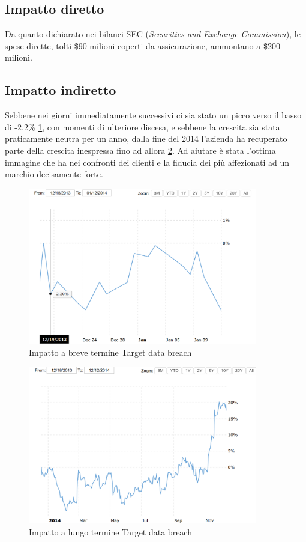 \documentclass[12pt,a4paper,openright,twoside]{report}
\begin{document}
\subsection{Impatto diretto}
Da quanto dichiarato nei bilanci SEC (\textit{Securities and Exchange Commission}), le spese dirette, tolti \$90 milioni coperti da assicurazione, ammontano a \$200 milioni\cite{Target}.
\subsection{Impatto indiretto}
Sebbene nei giorni immediatamente successivi ci sia stato un picco verso il basso di -2.2\% \ref{fig:tgt1}, con momenti di ulteriore discesa, e sebbene la crescita sia stata praticamente neutra per un anno, dalla fine del 2014 l'azienda ha recuperato parte della crescita inespressa fino ad allora \ref{fig:tgt2}. Ad aiutare \`e stata l'ottima immagine che ha nei confronti dei clienti e la fiducia dei pi\`u affezionati ad un marchio decisamente forte.\\
\begin{figure}[H] 
\begin{center} 
\includegraphics[width=10cm]{figures/target_short.png} 
\caption[Grafico Target short]{Impatto a breve termine Target data breach}\label{fig:tgt1}
\end{center}
\end{figure}
\begin{figure}[H]
\begin{center} 
\includegraphics[width=10cm]{figures/target_long.png} 
\caption[Grafico Target long]{Impatto a lungo termine Target data breach}\label{fig:tgt2}
\end{center}
\end{figure}
\end{document}
